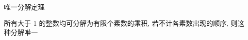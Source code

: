 \begin{frame}[fragile]{唯一分解定理}
	\begin{theorem}[唯一分解定理]
		\label{prime:th:unique-decomposition}

		所有大于 1 的整数均可分解为有限个素数的乘积, 若不计各素数出现的顺序, 则这种分解唯一
	\end{theorem}
\end{frame}
